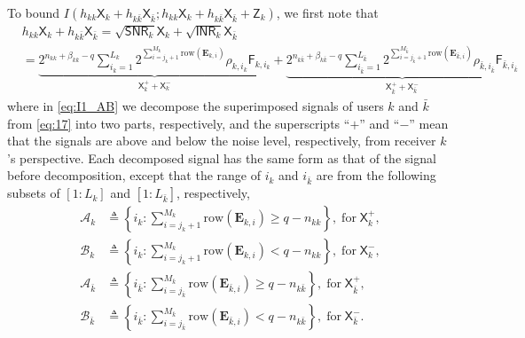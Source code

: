 \documentclass[12pt, draftclsnofoot, onecolumn]{IEEEtran}
\newcommand{\msf}[1]{\mathsf{#1}}
\newcommand{\SNR}{\msf{SNR}}
\newcommand{\INR}{\msf{INR}}
\theoremstyle{definition}
\begin{document}
To bound $I(h_{kk}\msf{X}_k+h_{k\bar{k}}\msf{X}_{\bar{k}};h_{kk}\msf{X}_k+h_{k\bar{k}}\msf{X}_{\bar{k}}+\msf{Z}_k)$, we first note that
\begin{subequations}\label{eq:decompose_X}
\begin{align}
&h_{kk}\msf{X}_k+h_{k\bar{k}}\msf{X}_{\bar{k}} =\sqrt{\SNR_k}\msf{X}_k+\sqrt{\INR_k}\msf{X}_{\bar{k}}  \label{eq:17}\\
 &= \underbrace{2^{n_{kk}+\beta_{kk}-q}\sum_{i_k=1}^{L_k}2^{\sum_{i=j_k+1}^{M_k}\text{row}(\boldsymbol{E}_{k,i})}\rho_{k,i_k}\msf{F}_{k,i_k}}_{\msf{X}_k^{+}+\msf{X}_k^{-}} %
+\underbrace{2^{n_{k\bar{k}}+\beta_{k\bar{k}}-q}\sum_{i_{\bar{k}}=1}^{L_{\bar{k}}}2^{\sum_{i=j_{\bar{k}}+1}^{M_{\bar{k}}}\text{row}(\boldsymbol{E}_{{\bar{k}},i})}\rho_{\bar{k},i_{\bar{k}}}\msf{F}_{\bar{k},i_{\bar{k}}}}_{\msf{X}_{\bar{k}}^{+}+\msf{X}_{\bar{k}}^{-}}  \label{eq:I1_AB}
\end{align}
\end{subequations}
where in \eqref{eq:I1_AB} we decompose the superimposed signals of users $k$ and $\bar{k}$ from \eqref{eq:17} into two parts, respectively, and the superscripts ``$+$'' and ``$-$'' mean that the signals are above and below the noise level, respectively, from receiver $k$'s perspective. Each decomposed signal has the same form as that of the signal before decomposition, except that the range of $i_k$ and $i_{\bar{k}}$ are from the following subsets of $[1:L_k]$ and $[1:L_{\bar{k}}]$, respectively,
\begin{align}
\mathcal{A}_k &\triangleq \left\{i_k: \sum\nolimits_{i=j_k+1}^{M_k}\text{row}(\boldsymbol{E}_{k,i})\geq q-n_{kk}\right\}, \;\text{for} \; \msf{X}_k^{+}, \label{eq:XA_set_k} \\
\mathcal{B}_k &\triangleq \left\{i_k: \sum\nolimits_{i=j_k+1}^{M_k}\text{row}(\boldsymbol{E}_{k,i})< q-n_{kk}\right\}, \;\text{for} \; \msf{X}_k^{-},  \label{eq:XB_set_k} \\
\mathcal{A}_{\bar{k}} &\triangleq \left\{i_{\bar{k}}: \sum\nolimits_{i=j_{\bar{k}}}^{M_{\bar{k}}}\text{row}(\boldsymbol{E}_{{\bar{k}},i})\geq q-n_{k\bar{k}}\right\},\;\text{for} \; \msf{X}_{\bar{k}}^{+}, \label{eq:XA_set_k1} \\
\mathcal{B}_{\bar{k}} &\triangleq \left\{i_{\bar{k}}: \sum\nolimits_{i=j_{\bar{k}}}^{M_{\bar{k}}}\text{row}(\boldsymbol{E}_{{\bar{k}},i})< q-n_{k\bar{k}}\right\}, \;\text{for} \; \msf{X}_{\bar{k}}^{-}. \label{eq:XB_set_k1}
\end{align}
\end{document}
